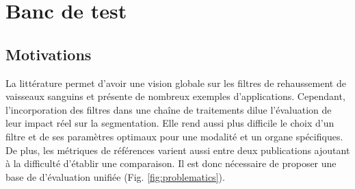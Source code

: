 %

\chapter{Banc de test}
\label{sec:Benchmark}


\section{Motivations}
\label{sec:Benchmark:Motivations}

 La littérature permet d'avoir une vision globale sur les filtres de rehaussement de vaisseaux sanguins et présente de nombreux exemples d'applications. Cependant, l'incorporation des filtres dans une chaîne de traitements dilue l'évaluation de leur impact réel sur la segmentation. Elle rend aussi plus difficile le choix d'un filtre et de ses paramètres optimaux pour une modalité et un organe spécifiques. De plus, les métriques de références varient aussi entre deux publications ajoutant à la difficulté d'établir une comparaison. Il est donc nécessaire de proposer une base de
 d'évaluation unifiée (Fig. \ref{fig:problematics}).

